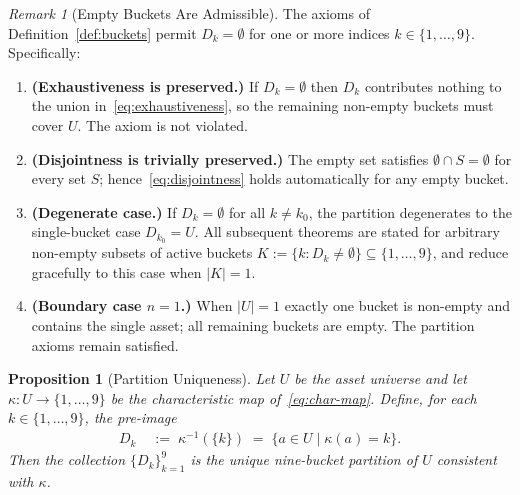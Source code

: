 \documentclass[12pt,openany]{book}
\newcommand{\calU}{\mathcal{U}}
\newcommand{\calD}{\mathcal{D}}
\numberwithin{equation}{chapter}
\theoremstyle{plain}
\newtheorem{proposition}[theorem]{Proposition}
\theoremstyle{definition}
\theoremstyle{remark}
\newtheorem{remark}[theorem]{Remark}
\def\calU{U}%
\def\calD{D}%
\def\mathcal#1{#1}%
\begin{document}
\begin{remark}[Empty Buckets Are Admissible]
\label{rem:empty-buckets}
The axioms of Definition~\ref{def:buckets} permit
$\calD_k = \emptyset$ for one or more indices $k \in \{1,\ldots,9\}$.
Specifically:
\begin{enumerate}
  \item \textbf{(Exhaustiveness is preserved.)}
        If $\calD_k = \emptyset$ then $\calD_k$ contributes nothing
        to the union in~\eqref{eq:exhaustiveness}, so the remaining
        non-empty buckets must cover $\calU$.  The axiom is not
        violated.
  \item \textbf{(Disjointness is trivially preserved.)}
        The empty set satisfies $\emptyset \cap S = \emptyset$ for
        every set $S$; hence~\eqref{eq:disjointness} holds
        automatically for any empty bucket.
  \item \textbf{(Degenerate case.)}
        If $\calD_k = \emptyset$ for all $k \neq k_0$, the partition
        degenerates to the single-bucket case
        $\calD_{k_0} = \calU$.
        All subsequent theorems are stated for arbitrary non-empty
        subsets of active buckets
        $\mathcal{K} := \{k : \calD_k \neq \emptyset\} \subseteq
        \{1,\ldots,9\}$, and reduce gracefully to this case when
        $|\mathcal{K}| = 1$.
  \item \textbf{(Boundary case $n=1$.)}
        When $|\calU|=1$ exactly one bucket is non-empty and
        contains the single asset; all remaining buckets are empty.
        The partition axioms remain satisfied.
\end{enumerate}
\end{remark}

\begin{proposition}[Partition Uniqueness]
\label{prop:partition-unique}
Let $\calU$ be the asset universe and let
$\kappa : \calU \to \{1,\ldots,9\}$
be the characteristic map of~\eqref{eq:char-map}.
Define, for each $k \in \{1,\ldots,9\}$, the pre-image
\begin{align}
  \calD_k
  &\;:=\; \kappa^{-1}(\{k\})
   \;=\; \bigl\{a \in \calU \;\big|\; \kappa(a) = k\bigr\}.
  \label{eq:partition-recovery}
\end{align}
Then the collection $\{\calD_k\}_{k=1}^{9}$ is the \emph{unique}
nine-bucket partition of $\calU$ consistent with $\kappa$.
\end{proposition}
\end{document}
